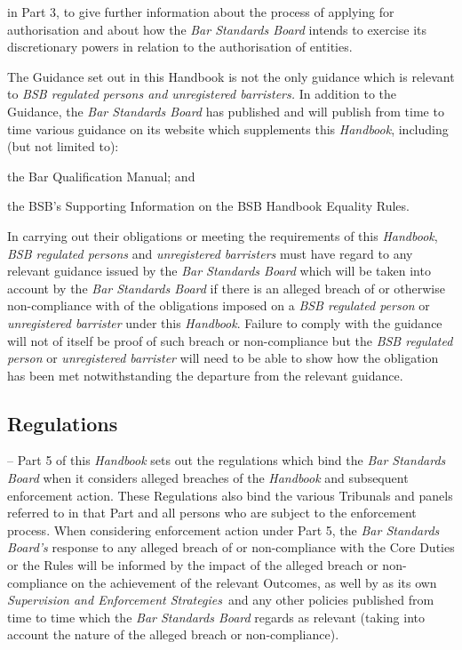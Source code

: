 \begin{numlist}
\begin{alphlist}
\begin{romlist}
\item in Part 3, to give further information about the process of applying
for authorisation and about how the \emph{Bar Standards Board} intends
to exercise its discretionary powers in relation to the authorisation of
entities.
\end{romlist}
\item The Guidance set out in this Handbook is not the only guidance which
is relevant to \emph{BSB \emph{regulated persons and unregistered
barristers}.} In addition to the Guidance, the \emph{Bar Standards
Board} has published and will publish from time to time various guidance
on its website which supplements this \emph{Handbook}, including (but
not limited to):
\begin{romlist}
\item the Bar Qualification Manual; and

\item the BSB's Supporting Information on the BSB Handbook Equality Rules.
\end{romlist}
\item In carrying out their obligations or meeting the requirements of this
\emph{Handbook}, \emph{BSB regulated persons} and \emph{unregistered
barristers} must have regard to any relevant guidance issued by the
\emph{Bar Standards Board} which will be taken into account by the
\emph{Bar Standards Board} if there is an alleged breach of or otherwise
non-compliance with of the obligations imposed on a \emph{BSB regulated
person} or \emph{unregistered barrister} under this \emph{Handbook}.
Failure to comply with the guidance will not of itself be proof of such
breach or non-compliance but the \emph{BSB regulated person} or
\emph{unregistered barrister} will need to be able to show how the
obligation has been met notwithstanding the departure from the relevant
guidance.\end{alphlist}
\item \subsection{Regulations} -- Part 5 of this \emph{Handbook} sets out the
regulations which bind the \emph{Bar Standards \emph{Board}} when it
considers alleged breaches of the \emph{Handbook} and subsequent
enforcement action. These Regulations also bind the various Tribunals
and panels referred to in that Part and all persons who are subject to
the enforcement process. When considering enforcement action under Part
5, the \emph{Bar Standards Board's} response to any alleged breach of or
non-compliance with the Core Duties or the Rules will be informed by the
impact of the alleged breach or non-compliance on the achievement of the
relevant Outcomes, as well by as its own \emph{Supervision and
Enforcement Strategies}~and any other policies published from time to
time which the \emph{Bar Standards Board} regards as relevant (taking
into account the nature of the alleged breach or non-compliance).
\end{numlist}


